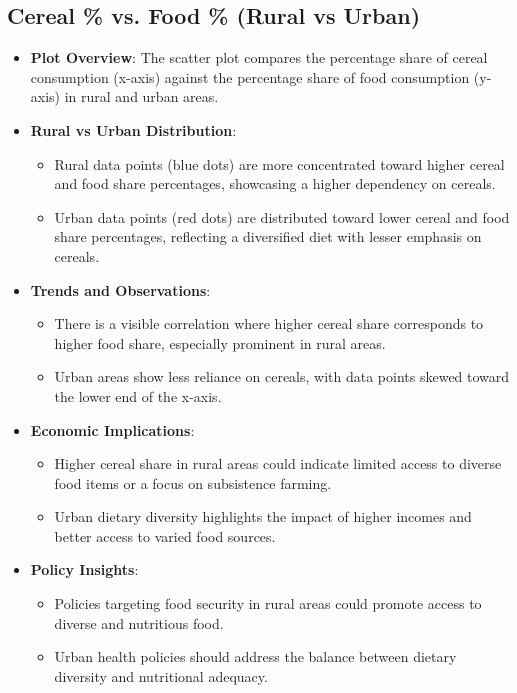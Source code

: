 \documentclass{article}
\begin{document}
\newpage


\subsection{ Cereal \% vs. Food \% (Rural vs Urban) 
	}

\begin{itemize}
	\item \textbf{Plot Overview}: The scatter plot compares the percentage share of cereal consumption (x-axis) against the percentage share of food consumption (y-axis) in rural and urban areas.
	\item \textbf{Rural vs Urban Distribution}:
	\begin{itemize}
		\item Rural data points (blue dots) are more concentrated toward higher cereal and food share percentages, showcasing a higher dependency on cereals.
		\item Urban data points (red dots) are distributed toward lower cereal and food share percentages, reflecting a diversified diet with lesser emphasis on cereals.
	\end{itemize}
	\item \textbf{Trends and Observations}:
	\begin{itemize}
		\item There is a visible correlation where higher cereal share corresponds to higher food share, especially prominent in rural areas.
		\item Urban areas show less reliance on cereals, with data points skewed toward the lower end of the x-axis.
	\end{itemize}
	\item \textbf{Economic Implications}:
	\begin{itemize}
		\item Higher cereal share in rural areas could indicate limited access to diverse food items or a focus on subsistence farming.
		\item Urban dietary diversity highlights the impact of higher incomes and better access to varied food sources.
	\end{itemize}
	\item \textbf{Policy Insights}:
	\begin{itemize}
		\item Policies targeting food security in rural areas could promote access to diverse and nutritious food.
		\item Urban health policies should address the balance between dietary diversity and nutritional adequacy.
	\end{itemize}
\end{itemize}
\end{document}
